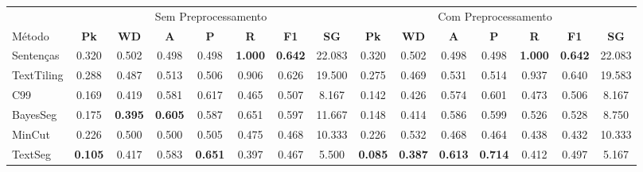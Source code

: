 \documentclass{article}
\begin{document}
 
\begin{longtable}[c]{|l|c|c|c|c|c|c|c||c|c|c|c|c|c|c|} 
\hline 
&\multicolumn{7}{c||}{Sem Preprocessamento} & \multicolumn{7}{c|}{Com Preprocessamento}\\ 
M\'{e}todo & \textbf{Pk} & \textbf{WD} & \textbf{A } & \textbf{P } & \textbf{R } & \textbf{F1} & \textbf{SG} & \textbf{Pk} & \textbf{WD} & \textbf{A } & \textbf{P } & \textbf{R } & \textbf{F1} & \textbf{SG}\\ \hline
Senten\c{c}as & 0.320 & 0.502 & 0.498 & 0.498 & \textbf{1.000} & \textbf{0.642} & 22.083 & 0.320 & 0.502 & 0.498 & 0.498 & \textbf{1.000} & \textbf{0.642} & 22.083\\ \hline
TextTiling & 0.288 & 0.487 & 0.513 & 0.506 & 0.906 & 0.626 & 19.500 & 0.275 & 0.469 & 0.531 & 0.514 & 0.937 & 0.640 & 19.583\\ \hline
C99 & 0.169 & 0.419 & 0.581 & 0.617 & 0.465 & 0.507 & 8.167 & 0.142 & 0.426 & 0.574 & 0.601 & 0.473 & 0.506 & 8.167\\ \hline
BayesSeg & 0.175 & \textbf{0.395} & \textbf{0.605} & 0.587 & 0.651 & 0.597 & 11.667 & 0.148 & 0.414 & 0.586 & 0.599 & 0.526 & 0.528 & 8.750\\ \hline
MinCut & 0.226 & 0.500 & 0.500 & 0.505 & 0.475 & 0.468 & 10.333 & 0.226 & 0.532 & 0.468 & 0.464 & 0.438 & 0.432 & 10.333\\ \hline
TextSeg & \textbf{0.105} & 0.417 & 0.583 & \textbf{0.651} & 0.397 & 0.467 & 5.500 & \textbf{0.085} & \textbf{0.387} & \textbf{0.613} & \textbf{0.714} & 0.412 & 0.497 & 5.167\\ \hline
\end{longtable} 
\end{document}
